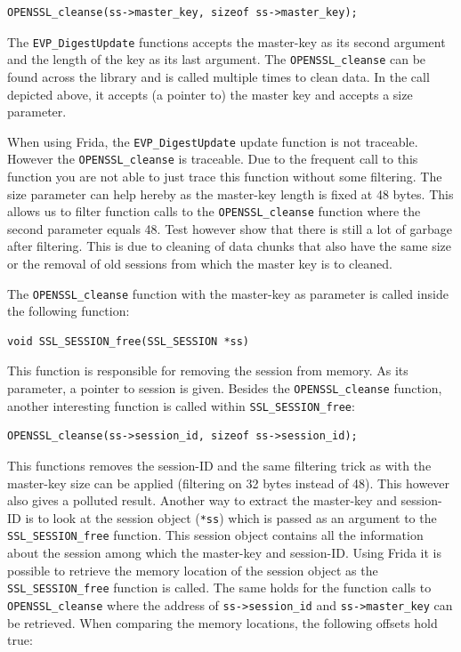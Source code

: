 \documentclass[12pt, a4paper]{report}
\begin{document}
\begin{lstlisting}[frame=single, breaklines=true]
OPENSSL_cleanse(ss->master_key, sizeof ss->master_key);
\end{lstlisting}

The \texttt{EVP\_DigestUpdate} functions accepts the master-key as its second argument and the length of the key as its last argument. The \texttt{OPENSSL\_cleanse} can be found across the library and is called multiple times to clean data. In the call depicted above, it accepts (a pointer to) the master key and accepts a size parameter. 

When using Frida, the \texttt{EVP\_DigestUpdate} update function is not traceable. However the \texttt{OPENSSL\_cleanse} is traceable. Due to the frequent call to this function you are not able to just trace this function without some filtering. The size parameter can help hereby as the master-key length is fixed at 48 bytes. This allows us to filter function calls to the \texttt{OPENSSL\_cleanse} function where the second parameter equals 48. Test however show that there is still a lot of garbage after filtering. This is due to cleaning of data chunks that also have the same size or the removal of old sessions from which the master key is to cleaned. 


\noindent The \texttt{OPENSSL\_cleanse} function with the master-key as parameter is called inside the following function:

\begin{lstlisting}[frame=single, breaklines=true]
void SSL_SESSION_free(SSL_SESSION *ss)
\end{lstlisting}

This function is responsible for removing the session from memory. As its parameter, a pointer to session is given. Besides the \texttt{OPENSSL\_cleanse} function, another interesting function is called within \texttt{SSL\_SESSION\_free}:
\\
\begin{lstlisting}[frame=single, breaklines=true]
OPENSSL_cleanse(ss->session_id, sizeof ss->session_id);
\end{lstlisting}

This functions removes the session-ID and the same filtering trick as with the master-key size can be applied (filtering on 32 bytes instead of 48). This however also gives a polluted result.
\newline
\newline
\noindent Another way to extract the master-key and session-ID is to look at the session object (\texttt{*ss}) which is passed as an argument to the \texttt{SSL\_SESSION\_free} function. This session object contains all the information about the session among which the master-key and session-ID. Using Frida it is possible to retrieve the memory location of the session object as the \texttt{SSL\_SESSION\_free} function is called. The same holds for the function calls to \texttt{OPENSSL\_cleanse} where the address of \texttt{ss->session\_id} and \texttt{ss->master\_key} can be retrieved. When comparing the memory locations, the following offsets hold true:
\end{document}
